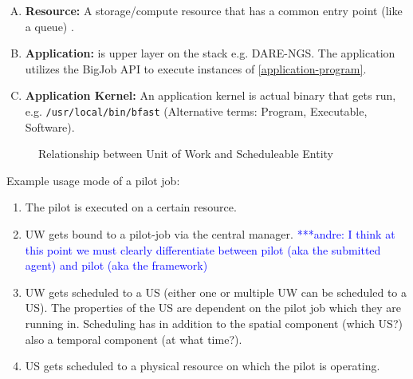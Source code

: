 \documentclass[]{article}
\newcommand{\alnote}[1]{ {\textcolor{blue} { ***andre: #1 }}}
\newcommand{\alnote}[1]{}
\begin{document}
\begin{enumerate}[A.]

\item \textbf{Resource:} A storage/compute resource that has a common
  entry point (like a queue) \label{resource}.

\item \textbf{Application:} is upper layer on the stack
  e.g. DARE-NGS. The application utilizes the BigJob API to execute
  instances of \ref{application-program}. \label{application}

\item \textbf{Application Kernel:} An application kernel is actual
  binary that gets run, e.g. \texttt{/usr/local/bin/bfast}
  (Alternative terms: Program, Executable,
  Software). \label{application-program}
	
\end{enumerate}

\begin{figure}[htbp]
        \centering    
{}\qquad\qquad
    \caption{Relationship between Unit of Work and Scheduleable Entity}
    \label{fig:figures_task-job1}
\end{figure}    

\noindent
Example usage mode of a pilot job:
\begin{enumerate}
    \item The pilot is executed on a certain resource.
    \item UW gets bound to a pilot-job via the central manager. 
    \alnote{I think at this point we must 
    clearly differentiate between pilot (aka the submitted agent) and pilot (aka 
    the framework)}
    \item UW gets scheduled to a US  (either one or multiple UW can be 
     scheduled to a US). The properties of the US are dependent on the pilot job 
     which they are running in. Scheduling has in addition to the spatial 
     component (which US?) also a temporal component (at what time?).
    \item US gets scheduled to a physical resource on which the pilot is 
     operating.
\end{enumerate}
\end{document}
